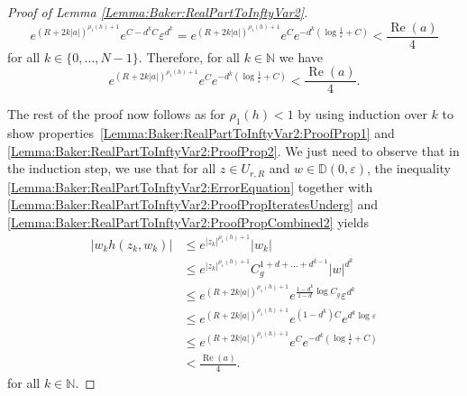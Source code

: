 \documentclass[a4paper, 12pt, twoside]{amsart}
\theoremstyle{definition}
\newtheorem{rem}[thm]{Remark}
\numberwithin{equation}{section}
\renewcommand{\Im}{\operatorname{Im}}
\renewcommand{\Re}{\operatorname{Re}}
\newcommand{\D}{{\mathbb D}}
\begin{document}
\begin{proof}[Proof of Lemma {\ref{Lemma:Baker:RealPartToInftyVar2}}]
	\begin{equation*}\label{Lemma:Baker:RealPartToInftyVar2:ProofPropEps2}
		e^{(R + 2k \lvert a \rvert)^{\rho_1(h) + 1}} e^{C - d^k C}\varepsilon^{d^k} =  e^{(R + 2k \lvert a \rvert)^{\rho_1(h) + 1}} e^{C}e^{-d^k (\log \frac{1}{\varepsilon} + C)} < \frac{\Re(a)}{4}
	\end{equation*}
	for all $k \in \lbrace 0, \dots, N-1 \rbrace$. 
	Therefore, for all $k \in \mathbb{N}$ we have
	\begin{equation}\label{Lemma:Baker:RealPartToInftyVar2:ProofPropCombined2}
		e^{(R + 2k \lvert a \rvert)^{\rho_1(h) + 1}} e^{C}e^{-d^k (\log \frac{1}{\varepsilon} + C)} < \frac{\Re(a)}{4}.
	\end{equation}
	
	The rest of the proof now follows as for $\rho_1(h) < 1$ by using induction over $k$ to show properties~\eqref{Lemma:Baker:RealPartToInftyVar2:ProofProp1} and \eqref{Lemma:Baker:RealPartToInftyVar2:ProofProp2}. We just need to observe that in the induction step, we use that for all $z \in U_{r,R}$ and $ w \in \D(0,\varepsilon)$, the inequality \eqref{Lemma:Baker:RealPartToInftyVar2:ErrorEquation} together with \eqref{Lemma:Baker:RealPartToInftyVar2:ProofPropIteratesUnderg} and \eqref{Lemma:Baker:RealPartToInftyVar2:ProofPropCombined2} yields
	\begin{equation*}
		\begin{split}
			\lvert w_k h(z_k, w_k) \rvert &\leq e^{\lvert z_k \rvert^{\rho_1(h) + 1}}  \lvert w_k \rvert \\
			&\leq e^{\lvert z_k \rvert^{\rho_1(h) + 1}}  C_g^{1 + d + \dots + d^{k-1}} \lvert w \rvert^{d^k}\\
            &\leq e^{(R + 2k \lvert a \rvert)^{\rho_1(h) + 1}} e^{\frac{1 - d^k}{1 - d} \log C_g} \varepsilon^{d^k} \\
            &\leq e^{(R + 2k \lvert a \rvert)^{\rho_1(h) + 1}} e^{(1 - d^k) C} e^{d^k \log \varepsilon} \\
			&\leq e^{(R + 2k \lvert a \rvert)^{\rho_1(h) + 1}} e^{C}e^{-d^k (\log \frac{1}{\varepsilon} + C)} \\
			&< \frac{\Re(a)}{4}.
		\end{split}
	\end{equation*}
	for all $k\in\mathbb{N}$.
\end{proof}

\end{document}
